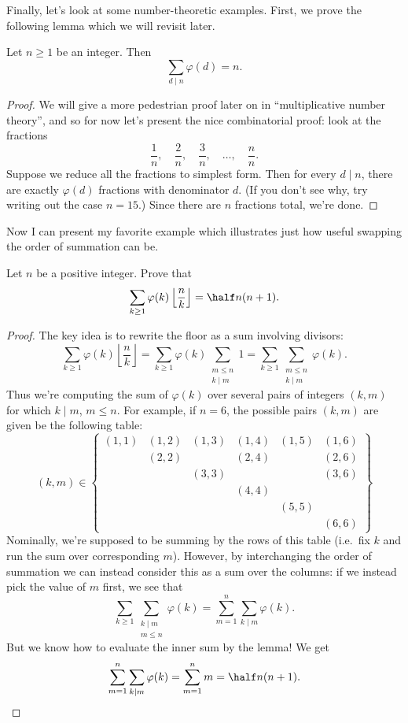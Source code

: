 \documentclass[11pt]{scrartcl}
\begin{document}
Finally, let's look at some number-theoretic examples.
First, we prove the following lemma which we will revisit later.
\begin{lemma}
  [$\varphi \ast \mathbf 1 = \id$]
  Let $n \ge 1$ be an integer.
  Then \[ \sum_{d \mid n} \varphi(d) =  n. \]
\end{lemma}
\begin{proof}
  We will give a more pedestrian proof later on in
  ``multiplicative number theory'', and so for now
  let's present the nice combinatorial proof:
  look at the fractions
  \[
    \frac{1}{n}, \quad \frac{2}{n}, \quad \frac{3}{n},
    \quad \dots, \quad \frac{n}{n}.
  \]
  Suppose we reduce all the fractions to simplest form.
  Then for every $d \mid n$,
  there are exactly $\varphi(d)$ fractions with denominator $d$.
  (If you don't see why, try writing out the case $n=15$.)
  Since there are $n$ fractions total, we're done.
\end{proof}
Now I can present my favorite example which illustrates
just how useful swapping the order of summation can be.
\begin{example}
  Let $n$ be a positive integer.
  Prove that
  \[ \sum_{k \ge 1} \varphi(k) \left\lfloor \frac nk \right\rfloor
    = \half n (n+1).  \]
\end{example}
\begin{proof}
  The key idea is to rewrite the floor as a sum involving divisors:
  \[ \sum_{k \ge 1} \varphi(k) \left\lfloor \frac nk \right\rfloor
    = \sum_{k \ge 1} \varphi(k) \sum_{\substack{m \le n \\ k \mid m}} 1
    = \sum_{k \ge 1} \sum_{\substack{m \le n \\ k \mid m}} \varphi(k).
  \]
  Thus we're computing the sum of $\varphi(k)$
  over several pairs of integers $(k,m)$ for which $k \mid m$, $m \le n$.
  For example, if $n = 6$, the possible pairs $(k,m)$ are given be the following table:
  \[
    (k,m) \in
    \left\{
    \begin{array}{cccccc}
      (1,1) & (1,2) & (1,3) & (1,4) & (1,5) & (1,6) \\
      & (2,2) && (2,4) && (2,6) \\
      && (3,3) &&& (3,6) \\
      &&& (4,4) && \\
      &&&& (5,5) & \\
      &&&&& (6,6)
    \end{array}
    \right\}
  \]
  Nominally, we're supposed to be summing by the rows of this table
  (i.e.\ fix $k$ and run the sum over corresponding $m$).
  However, by interchanging the order of summation we can instead
  consider this as a sum over the columns:
  if we instead pick the value of $m$ first, we see that
  \[
    \sum_{k \ge 1} \sum_{\substack{k \mid m \\ m \le n}} \varphi(k)
    = \sum_{m = 1}^n \sum_{k \mid m} \varphi(k).
  \]
  But we know how to evaluate the inner sum by the lemma! We get
  \[ \sum_{m = 1}^n \sum_{k \mid m} \varphi(k)
    = \sum_{m=1}^n m = \half n(n+1). \qedhere \]
\end{proof}
\end{document}
